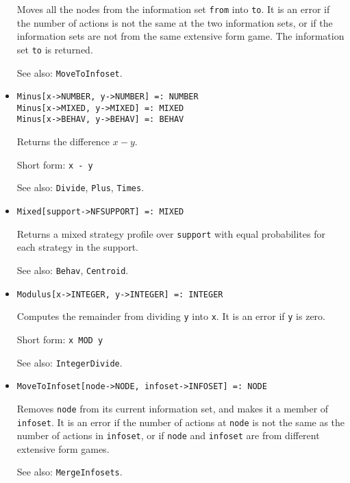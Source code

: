 \begin{itemize}
\bd
Moves all the nodes from the information set \verb+from+ into \verb+to+.
It is an error if the number of actions is not the same at the
two information sets, or if the information sets are not from the
same extensive form game.  The information set \verb+to+ is returned.
\item [See also:] \verb+MoveToInfoset+.
\ed

\item 
\protect \large \begin{verbatim}
Minus[x->NUMBER, y->NUMBER] =: NUMBER 
Minus[x->MIXED, y->MIXED] =: MIXED 
Minus[x->BEHAV, y->BEHAV] =: BEHAV 
\end{verbatim} \normalsize

\bd
Returns the difference $x - y$.
\item [Short form:] \verb+x - y+
\item [See also:] \verb+Divide+, \verb+Plus+, \verb+Times+.
\ed

\item{}
\protect \large \begin{verbatim}
Mixed[support->NFSUPPORT] =: MIXED 
\end{verbatim}\normalsize

\bd
Returns a mixed strategy profile over \verb+support+ with equal
probabilites for each strategy in the support.  
\item [See also:] \verb+Behav+, \verb+Centroid+.
\ed

\item{}
\protect \large \begin{verbatim}
Modulus[x->INTEGER, y->INTEGER] =: INTEGER 
\end{verbatim}\normalsize

\bd
Computes the remainder from dividing \verb+y+ into \verb+x+.  It is an
error if \verb+y+ is zero.
\item [Short form:] \verb+x MOD y+
\item [See also:] \verb+IntegerDivide+.
\ed


\item{}
\protect \large \begin{verbatim}
MoveToInfoset[node->NODE, infoset->INFOSET] =: NODE 
\end{verbatim}\normalsize

\bd
Removes \verb+node+ from its current information set, and makes it a
member of \verb+infoset+. It is an error if the number of actions at
\verb+node+ is not the same as the number of actions in
\verb+infoset+, or if \verb+node+ and \verb+infoset+ are from
different extensive form games.   
\item [See also:] \verb+MergeInfosets+.
\ed



\end{itemize}
